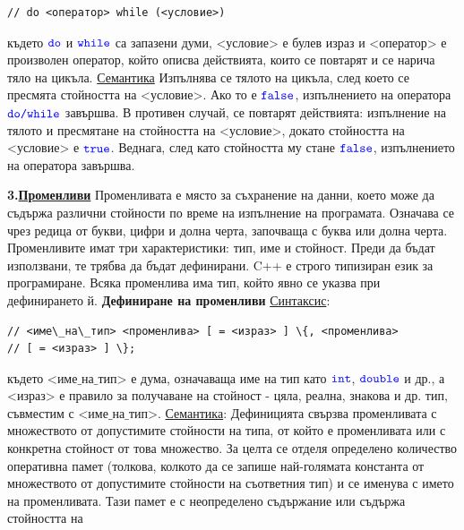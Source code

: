 \documentclass{article}
\begin{document}
\begin{itemize}
\begin{lstlisting}[style=cpp]
// do <оператор> while (<условие>)    
\end{lstlisting}
където $\textcolor{blue}{\texttt{do}}$ и $\textcolor{blue}{\texttt{while}}$ са запазени думи, <условие> е булев израз и <оператор> е произволен оператор, който описва действията,
които се повтарят и се нарича тяло на цикъла. \newline
\underline{Семантика} \newline
Изпълнява се тялото на цикъла, след което се пресмята стойността на <условие>. Ако то е $\textcolor{blue}{\texttt{false}}$, изпълнението на оператора
$\textcolor{blue}{\texttt{do/while}}$ завършва. В противен случай, се повтарят действията: изпълнение на тялото и пресмятане на стойността на <условие>,
докато стойността на <условие> е $\textcolor{blue}{\texttt{true}}$. Веднага, след като стойността му стане $\textcolor{blue}{\texttt{false}}$, изпълнението на оператора завършва.
\end{itemize}
\textbf{3.\underline{Променливи}} \newline\newline
Променливата е място за съхранение на данни, което може да съдържа различни стойности по време на изпълнение на програмата.
Означава се чрез редица от букви, цифри и долна черта, започваща с буква или долна черта. Променливите имат три характеристики:
тип, име и стойност. Преди да бъдат използвани, те трябва да бъдат дефинирани. C++ е строго типизиран език за програмиране.
Всяка променлива има тип, който явно се указва при дефинирането й. \newline\newline
\textbf{Дефиниране на променливи} \newline\newline
\underline{Синтаксис}:
\begin{lstlisting}[style=cpp]
// <име\_на\_тип> <променлива> [ = <израз> ] \{, <променлива>
// [ = <израз> ] \};
\end{lstlisting}
където $\text{<име\_на\_тип>}$ е дума, означаваща име на тип като $\textcolor{blue}{\texttt{int}}$, $\textcolor{blue}{\texttt{double}}$ и др., а <израз> е правило за получаване на стойност - цяла,
реална, знакова и др. тип, съвместим с $\text{<име\_на\_тип>}$. \newline
\underline{Семантика}: \newline
Дефиницията свързва променливата с множеството от допустимите стойности на типа, от който е променливата или
с конкретна стойност от това множество. За целта се отделя определено количество оперативна памет
(толкова, колкото да се запише най-голямата константа от множеството от допустимите стойности на съответния
тип) и се именува с името на променливата. Тази памет е с неопределено съдържание или съдържа стойността на
\end{document}
